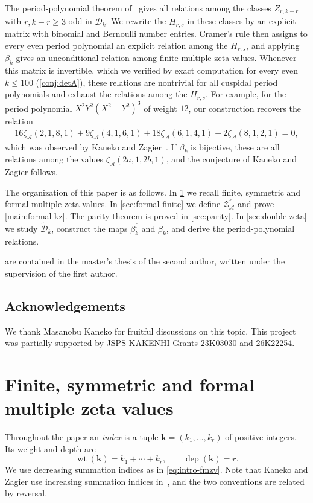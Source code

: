 \documentclass[12pt]{amsart}
\numberwithin{equation}{section}
\theoremstyle{plain}
\DeclareMathOperator{\wt}{wt}
\DeclareMathOperator{\dep}{dep}
\newcommand{\ZAf}{{\mathcal Z_{\mathcal A}^{\mathrm f}}}
\newcommand{\za}[1]{\zeta_{\mathcal A}(#1)}
\newcommand{\Dtk}{\widetilde{\mathcal D}_k}
\begin{document}
The period-polynomial theorem of~\cite{GKZ} gives all relations among the
classes $Z_{r,k-r}$ with $r,k-r\geq3$ odd in $\Dtk$. We rewrite the $H_{r,s}$ in
these classes by an explicit matrix with binomial and Bernoulli number entries.
Cramer's rule then assigns to every even period polynomial an explicit relation
among the $H_{r,s}$, and applying $\beta_k$ gives an unconditional relation
among finite multiple zeta values. Whenever this matrix is invertible, which
we verified by exact computation for every even $k\leq100$
(\cref{conj:detA}), these relations
are nontrivial for all cuspidal period polynomials and exhaust the relations
among the $H_{r,s}$. For example, for the period polynomial
$X^2Y^2(X^2-Y^2)^3$ of weight $12$, our construction recovers the relation
\begin{align}\label{eq:intro-weight-twelve-relation}
 16\za{2,1,8,1}+9\za{4,1,6,1}
 +18\za{6,1,4,1}-2\za{8,1,2,1}=0,
\end{align}
which was observed by Kaneko and Zagier~\cite{KZ}.
If $\beta_k$ is bijective, these are all relations among the values
$\za{2a,1,2b,1}$, and the conjecture of Kaneko and Zagier follows.

The organization of this paper is as follows. In \cref{sec:prelim} we recall finite,
symmetric and formal multiple zeta values. In \cref{sec:formal-finite} we
define $\ZAf$ and prove \cref{main:formal-kz}. The parity theorem is proved in
\cref{sec:parity}. In \cref{sec:double-zeta} we study $\Dtk$, construct the
maps $\beta_k^{\mathrm f}$ and $\beta_k$, and derive the period-polynomial
relations.

 are contained in the master's thesis
\cite{Risan} of the second author, written under the supervision of the first
author. 

\subsection*{Acknowledgements}
We thank Masanobu Kaneko for fruitful discussions on this topic. This
project was partially supported by JSPS KAKENHI Grants 23K03030 and
26K22254.

\section{Finite, symmetric and formal multiple zeta values}\label{sec:prelim}

Throughout the paper an \emph{index} is a tuple $\boldsymbol{k}=(k_1,\ldots,k_r)$ of positive integers. Its weight and depth are
\[
 \wt(\boldsymbol{k})=k_1+\cdots+k_r,
 \qquad \dep(\boldsymbol{k})=r.
\]
We use decreasing summation indices as in \eqref{eq:intro-fmzv}. Note that Kaneko and Zagier use increasing summation indices in~\cite{KZ}, and the two conventions are related by reversal.
\end{document}

